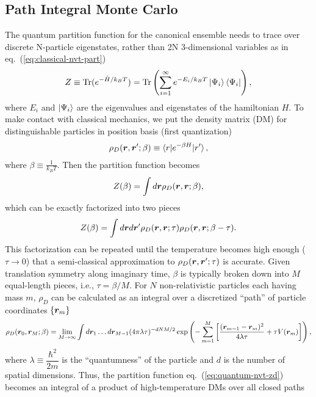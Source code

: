\subsection{Path Integral Monte Carlo} \label{sec:method-pimc}
The quantum partition function for the canonical ensemble needs to trace over discrete N-particle eigenstates, rather than 2N 3-dimensional variables as in eq.~(\ref{eq:classical-nvt-part})
\begin{align}
Z\equiv \text{Tr}(e^{-\hat{H}/k_BT})=\text{Tr}\left(
\sum\limits_{i=1}^{\infty} e^{-E_i/k_BT}\ket{\Psi_i}\bra{\Psi_i}
\right),
\end{align}
where $E_i$ and $\ket{\Psi_i}$ are the eigenvalues and eigenstates of the hamiltonian $H$. To make contact with classical mechanics, we put the density matrix (DM) for distinguishable particles in position basis (first quantization)
\begin{align}
\rho_D(\boldsymbol{r}, \boldsymbol{r}'; \beta) \equiv \braket{r|e^{-\beta H}|r'},
\end{align}
where $\beta\equiv \frac{1}{k_B T}$. 
Then the partition function becomes
\begin{align} \label{eq:quantum-nvt-zd}
Z(\beta) = \int d\boldsymbol{r} \rho_D(\boldsymbol{r},\boldsymbol{r};\beta),
\end{align}
which can be exactly factorized into two pieces
\begin{align}
Z(\beta) = \int d\boldsymbol{r}d\boldsymbol{r}' \rho_D(\boldsymbol{r},\boldsymbol{r};\tau)\rho_D(\boldsymbol{r},\boldsymbol{r};\beta-\tau).
\end{align}
This factorization can be repeated until the temperature becomes high enough ($\tau\rightarrow0$) that a semi-classical approximation to $\rho_D(\boldsymbol{r},\boldsymbol{r}';\tau)$ is accurate. Given translation symmetry along imaginary time, $\beta$ is typically broken down into $M$ equal-length pieces, i.e., $\tau=\beta/M$.
For $N$ non-relativistic particles each having mass $m$, $\rho_D$ can be calculated as an integral over a discretized ``path'' of particle coordinates $\{\boldsymbol{r}_m\}$
\begin{align} \label{eq:pimc-rhod}
\rho_D(\boldsymbol{r}_0,\boldsymbol{r}_M;\beta) = \lim\limits_{M\rightarrow\infty} \int d\boldsymbol{r}_1\dots d\boldsymbol{r}_{M-1}
(4\pi\lambda\tau)^{-dNM/2}\exp\left(
-\sum\limits_{m=1}^M \left[
\dfrac{(\boldsymbol{r}_{m-1}-\boldsymbol{r}_m)^2}{4\lambda\tau} + \tau V(\boldsymbol{r}_m)
\right]
\right),
\end{align}
where $\lambda\equiv\dfrac{\hbar^2}{2m}$ is the ``quantumness'' of the particle and $d$ is the number of spatial dimensions. Thus, the partition function eq.~(\ref{eq:quantum-nvt-zd}) becomes an integral of a product of high-temperature DMs over all closed paths

